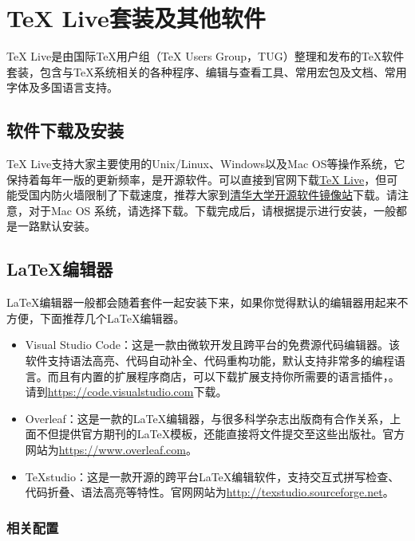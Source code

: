 \section{\TeX{} Live套装及其他软件}

\TeX{} Live是由国际\TeX{}用户组（\TeX{} Users Group，TUG）整理和发布的\TeX{}软件套装，包含与\TeX{}系统相关的各种程序、编辑与查看工具、常用宏包及文档、常用字体及多国语言支持。

\subsection{软件下载及安装}

\TeX{} Live支持大家主要使用的Unix/Linux、Windows以及Mac OS等操作系统，它保持着每年一版的更新频率，是开源软件。可以直接到\href{https://www.tug.org}{}官网下载\href{https://www.tug.org/texlive}{\TeX{} Live}，但可能受国内防火墙限制了下载速度，推荐大家到\href{https://mirrors.tuna.tsinghua.edu.cn/CTAN/}{清华大学开源软件镜像站}下载。请注意，对于Mac OS 系统，请选择下载。下载完成后，请根据提示进行安装，一般都是一路默认安装。

\subsection{\LaTeX{}编辑器}

\LaTeX{}编辑器一般都会随着套件一起安装下来，如果你觉得默认的编辑器用起来不方便，下面推荐几个\LaTeX{}编辑器。
\begin{itemize}
    \item Visual Studio Code：这是一款由微软开发且跨平台的免费源代码编辑器。该软件支持语法高亮、代码自动补全、代码重构功能，默认支持非常多的编程语言。而且有内置的扩展程序商店，可以下载扩展支持你所需要的语言插件，。请到\url{https://code.visualstudio.com}下载。
    \item Overleaf：这是一款的\LaTeX{}编辑器，与很多科学杂志出版商有合作关系，上面不但提供官方期刊的\LaTeX{}模板，还能直接将文件提交至这些出版社。官方网站为\url{https://www.overleaf.com}。
    \item TeXstudio：这是一款开源的跨平台\LaTeX{}编辑软件，支持交互式拼写检查、代码折叠、语法高亮等特性。官网网站为\url{http://texstudio.sourceforge.net}。
\end{itemize}

\subsubsection{相关配置}

